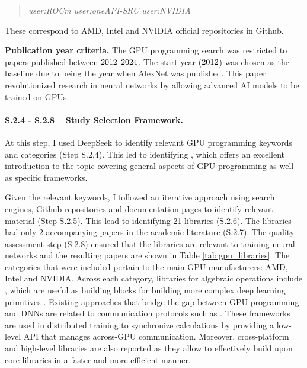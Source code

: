 \begin{quote}
	\textit{user:ROCm user:oneAPI-SRC user:NVIDIA}
\end{quote}

These correspond to AMD, Intel and NVIDIA official repositories in Github.

\textbf{Publication year criteria.}
The GPU programming search was restricted to papers published between
$2012$-$2024$. The start year ($2012$) was chosen as the baseline due
to being the year when AlexNet \cite{krizhevsky_imagenet_2012} was published. This paper
revolutionized research in neural networks by allowing advanced AI models to be trained on GPUs.

\paragraph{S.2.4 - S.2.8 -- Study Selection Framework.}
\label{sec:ai-screening}
At this step, I used DeepSeek \cite{noauthor_deepseek_nodate} to identify relevant GPU programming
keywords and categories (Step S.2.4). This led to identifying \cite{noauthor_enccsgpu-programming_nodate}, which
offers an excellent introduction to the topic covering general aspects of GPU programming as well
as specific frameworks.





Given the relevant keywords, I followed an iterative approach using search engines, Github
repositories and documentation pages to identify relevant material (Step S.2.5). This lead to
identifying 21 libraries (S.2.6). The libraries had only 2 accompanying papers
\cite{chetlur_cudnn_2014,okuta_cupy_2017} in the academic literature (S.2.7). The quality
assessment step (S.2.8) ensured that the libraries are relevant to training neural networks and the
resulting papers are shown in Table \ref{tab:gpu_libraries}. The categories that were included
pertain to the main GPU manufacturers: AMD, Intel and NVIDIA. Across each category, libraries for
algebraic operations include \cite{noauthor_cublas_nodate,noauthor_rocmrocblas_2025,
	noauthor_uxlfoundationonemath_2025}, which are useful as building blocks for building more complex
deep learning primitives
\cite{chetlur_cudnn_2014,noauthor_rocmmiopen_2025,onednn_contributors_oneapi_2025}. Existing
approaches that bridge the gap between GPU programming and DNNs are related to communication
protocols such as
\cite{noauthor_nvidianccl_2025,noauthor_rocmrccl_2025,noauthor_uxlfoundationoneccl_2025}. These
frameworks are used in distributed training to synchronize calculations by providing a low-level
API that manages across-GPU communication. Moreover, cross-platform and high-level libraries are
also reported as they allow to effectively build upon core libraries in a faster and more efficient
manner.

